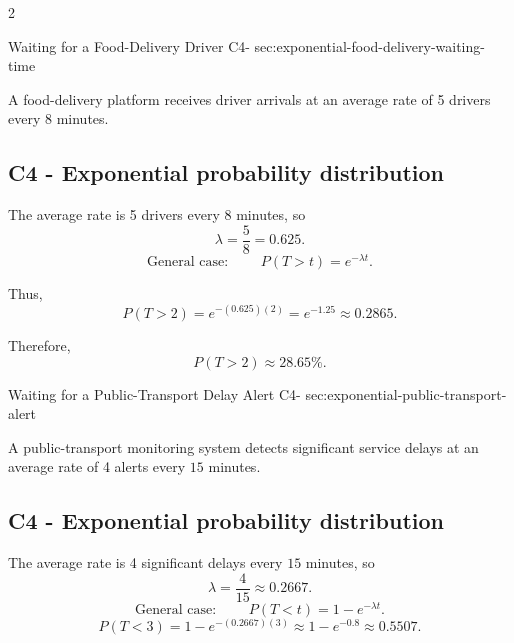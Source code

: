 	\newpage
	\begin{multicols}{2}
		
		\sectionScored
		{Waiting for a Food-Delivery Driver}
		{C4-}
		{sec:exponential-food-delivery-waiting-time}
		{
			A food-delivery platform receives driver arrivals at an
			average rate of 5 drivers every \(8\) minutes.
			
			
			\label{subsec:exponential-food-delivery-probability}
			\subsection*{C4 - Exponential probability distribution }
			
			The average rate is 5 drivers every \(8\) minutes, so
			\[
			\lambda=\frac{5}{8}=0.625.
			\]
			\[
			\text{General case: } \qquad P(T>t)=e^{-\lambda t}.
			\]
			
			Thus,
			\[
			P(T>2)
			=e^{-(0.625)(2)}
			=e^{-1.25}
			\approx0.2865.
			\]
			
			Therefore,
			\[
			\boxed{P(T>2)\approx28.65\%}.
			\]
			
			\vspace{-5mm}
		}
		
		\sectionScored
		{Waiting for a Public-Transport Delay Alert}
		{C4-}
		{sec:exponential-public-transport-alert}
		{
			A public-transport monitoring system detects significant service delays
			at an average rate of 4 alerts every \(15\) minutes.
			
			
			\label{subsec:exponential-public-transport-alert-probability}
			\subsection*{C4 - Exponential probability distribution }
			\vspace{-3mm}
			The average rate is 4 significant delays every \(15\) minutes, so
			\[
			\lambda=\frac{4}{15}\approx0.2667.
			\]
			\[
			\text{General case: } \qquad P(T<t)=1-e^{-\lambda t}.
			\]
			\[
			P(T<3)
			=1-e^{-(0.2667)(3)}
			\approx1-e^{-0.8}
			\approx0.5507.
			\]
			
}
\end{multicols}
